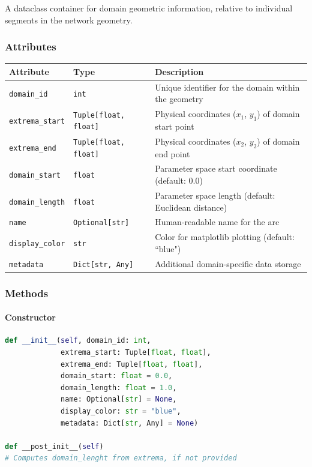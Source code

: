 A dataclass container for domain geometric information, relative to individual segments in the network geometry.

\subsubsection{Attributes}

\begin{longtable}{|p{3cm}|p{3.5cm}|p{6cm}|}
\hline
\textbf{Attribute} & \textbf{Type} & \textbf{Description} \\
\hline
\endhead

\texttt{domain\_id} & \texttt{int} & Unique identifier for the domain within the geometry \\
\hline

\texttt{extrema\_start} & \texttt{Tuple[float, float]} & Physical coordinates ($x_1$, $y_1$) of domain start point \\
\hline

\texttt{extrema\_end} & \texttt{Tuple[float, float]} & Physical coordinates ($x_2$, $y_2$) of domain end point \\
\hline

\texttt{domain\_start} & \texttt{float} & Parameter space start coordinate (default: 0.0) \\
\hline

\texttt{domain\_length} & \texttt{float} & Parameter space length (default: Euclidean distance) \\
\hline

\texttt{name} & \texttt{Optional[str]} & Human-readable name for the arc \\
\hline

\texttt{display\_color} & \texttt{str} & Color for matplotlib plotting (default: ``blue") \\
\hline

\texttt{metadata} & \texttt{Dict[str, Any]} & Additional domain-specific data storage \\
\hline

\end{longtable}

\subsubsection{Methods}

\paragraph{Constructor}
\begin{lstlisting}[language=Python, caption=DomainInfo Constructor]
def __init__(self, domain_id: int, 
             extrema_start: Tuple[float, float],
             extrema_end: Tuple[float, float],
             domain_start: float = 0.0,
             domain_length: float = 1.0,
             name: Optional[str] = None,
             display_color: str = "blue",
             metadata: Dict[str, Any] = None)
                          
def __post_init__(self)
# Computes domain_lenght from extrema, if not provided
\end{lstlisting}


